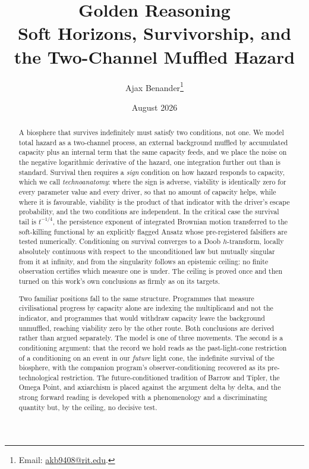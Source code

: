 \documentclass[11pt]{article}
\title{Golden Reasoning\\[4pt]
\large Soft Horizons, Survivorship, and the Two-Channel Muffled Hazard}
\author{Ajax Benander\thanks{Email: \href{mailto:akb9408@rit.edu}{akb9408@rit.edu}.}}
\date{August 2026}
\numberwithin{equation}{section}
\theoremstyle{plain}
\theoremstyle{definition}
\theoremstyle{remark}
\begin{document}
\maketitle

\begin{abstract}\small
\noindent A biosphere that survives indefinitely must satisfy two
conditions, not one. We model total hazard as a two-channel process,
an external background muffled by accumulated capacity plus an
internal term that the same capacity feeds, and we place the noise
on the negative logarithmic derivative of the hazard, one
integration further out than is standard. Survival then requires a
\emph{sign} condition on how hazard responds to capacity, which we
call \emph{technoanatomy}: where the sign is adverse, viability is
identically zero for every parameter value and every driver, so that
no amount of capacity helps, while where it is favourable, viability
is the product of that indicator with the driver's escape
probability, and the two conditions are independent. In the critical
case the survival tail is $t^{-1/4}$, the persistence exponent of
integrated Brownian motion transferred to the soft-killing
functional by an explicitly flagged Ansatz whose pre-registered
falsifiers are tested numerically. Conditioning on survival
converges to a Doob $h$-transform, locally absolutely continuous
with respect to the unconditioned law but mutually singular from it
at infinity, and from the singularity follows an epistemic ceiling:
no finite observation certifies which measure one is under. The
ceiling is proved once and then turned on this work's own
conclusions as firmly as on its targets.

Two familiar positions fall to the same structure. Programmes that
measure civilisational progress by capacity alone are indexing the
multiplicand and not the indicator, and programmes that would
withdraw capacity leave the background unmuffled, reaching viability
zero by the other route. Both conclusions are derived rather than
argued separately. The model is one of three movements. The second is a conditioning
argument: that the record we hold reads as the past-light-cone
restriction of a conditioning on an event in our \emph{future} light
cone, the indefinite survival of the biosphere, with the companion
program's observer-conditioning recovered as its pre-technological
restriction. The future-conditioned tradition of Barrow and Tipler,
the Omega Point, and axiarchism is placed against the argument delta
by delta, and the strong forward reading is developed with a
phenomenology and a discriminating quantity but, by the ceiling, no
decisive test.


\end{abstract}
\end{document}
